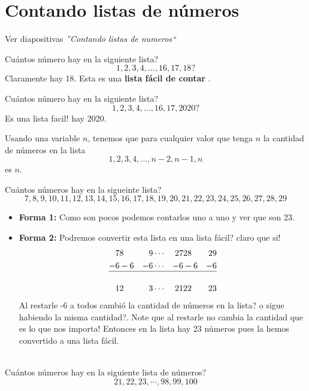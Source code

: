 \chapter{Contando listas de números}\label{combinatoria:contando_listas_de_numeros}
Ver diapositivas \textit{''Contando listas de numeros``}

\begin{ejemplo}
Cuántos número hay en la siguiente lista?
\[
1,2,3,4,\dots,16,17,18?
\]
Claramente hay 18. Esta es una \textbf{lista fácil de contar }.
\end{ejemplo}

\begin{ejemplo}
	Cuántos número hay en la siguiente lista?
	\[
	1,2,3,4,\dots,16,17,2020?
	\]
	Es una lista facil! hay 2020.
\end{ejemplo}

\begin{tcolorbox}[colback=red!5!white,colframe=red!75!black]
	Usando una variable $n$, tenemos que para cualquier valor que tenga $n$ la cantidad de números en la lista
	\[
	1,2,3,4,\dots,n-2,n-1,n
	\]
	es $n$.
\end{tcolorbox}



\begin{ejemplo}
Cuántos números hay en la sigueinte lista?
\[
7,8,9,10,11,12,13,14,15,16,17,18,19,20,21,22,23,24,25,26,27,28,29
\]
\begin{itemize}
	\item \textbf{Forma 1: }Como son pocos podemos contarlos uno a uno y ver que son 23.
	\item \textbf{Forma 2: } Podremos convertir esta lista en una lista fácil? claro que si!
			\begin{align*}
				7  & 8   &9  &\cdots  &27&28 &29\\
				-6 & -6 &-6 &\cdots &-6 &-6 &-6\\
				\hline \\
				1  &2   &3  &\cdots  &21&22 &23
			\end{align*}
			Al restarle -6 a todos cambió la cantidad de números en la lista? o sigue habiendo la misma cantidad?. Note que al restarle no cambia la cantidad que es lo que nos importa! Entonces en la lista hay 23 números pues la hemos convertido a una lista fácil.
\end{itemize}
\end{ejemplo}

\begin{exer}{\ \\}
	Cuántos números hay en la siguiente lista de números?
	\[21,22,23,\cdots, 98,99,100\]
\end{exer}

